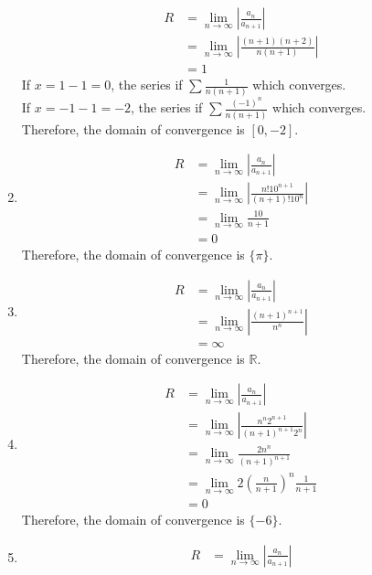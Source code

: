\documentclass[fleqn, a4paper, 12pt, oneside]{amsart}
\theoremstyle{definition}
\theoremstyle{theorem}
\begin{document}
\begin{solution}
\begin{enumerate}[leftmargin = *]
			\begin{align*}
				R &= \lim\limits_{n \to \infty} \left| \frac{a_n}{a_{n + 1}} \right|\\
				&= \lim\limits_{n \to \infty} \left| \frac{(n + 1) (n + 2)}{n (n + 1)} \right|\\
				&= 1
			\end{align*}
			If $x = 1 - 1 = 0$, the series if $\sum \frac{1}{n (n + 1)}$ which converges.\\
			If $x = -1 - 1 = -2$, the series if $\sum \frac{(-1)^n}{n (n + 1)}$ which converges.\\
			Therefore, the domain of convergence is $[0,-2]$.
		\item
			\begin{align*}
				R &= \lim\limits_{n \to \infty} \left| \frac{a_n}{a_{n + 1}} \right|\\
				&= \lim\limits_{n \to \infty} \left| \frac{n! 10^{n + 1}}{(n + 1)! 10^n} \right|\\
				&= \lim\limits_{n \to \infty} \frac{10}{n + 1}\\
				&= 0
			\end{align*}
			Therefore, the domain of convergence is $\{\pi\}$.
		\item
			\begin{align*}
				R &= \lim\limits_{n \to \infty} \left| \frac{a_n}{a_{n + 1}} \right|\\
				&= \lim\limits_{n \to \infty} \left| \frac{(n + 1)^{n + 1}}{n^n} \right|\\
				&= \infty
			\end{align*}
			Therefore, the domain of convergence is $\mathbb{R}$.
		\item
			\begin{align*}
				R &= \lim\limits_{n \to \infty} \left| \frac{a_n}{a_{n + 1}} \right|\\
				&= \lim\limits_{n \to \infty} \left| \frac{n^n 2^{n + 1}}{(n + 1)^{n + 1} 2^n} \right|\\
				&= \lim\limits_{n \to \infty} \frac{2 n^n}{(n + 1)^{n + 1}}\\
				&= \lim\limits_{n \to \infty} 2 \left( \frac{n}{n + 1} \right)^n \frac{1}{n + 1}\\
				&= 0
			\end{align*}
			Therefore, the domain of convergence is $\{-6\}$.
		\item
			\begin{align*}
				R &= \lim\limits_{n \to \infty} \left| \frac{a_n}{a_{n + 1}} \right|\\

\end{align*}
\end{enumerate}
\end{solution}
\end{document}
